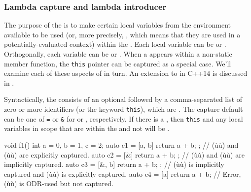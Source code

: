 \subsubsection[Lambda capture and lambda introducer]{Lambda capture and lambda introducer}\label{lambda-capture-and-lambda-introducer}

The purpose of the  is to make certain local
variables from the environment available to be used (or, more precisely,
, which means that they are used in a
potentially-evaluated context) within the . Each
local variable can be  or . Orthogonally, each variable can be  or . When a  appears within a non-static member function, the
\lstinline!this! pointer can be captured as a special case. We'll examine
each of these aspects of  in turn. An extension
to  in C++14 is discussed in .

Syntactically, the  consists of an optional
 followed by a comma-separated list of zero or
more identifiers (or the keyword \lstinline!this!), which are
. The capture default can be one of
\lstinline!=! or \lstinline!&! for  or
, respectively. If there is a
, then \lstinline!this! and any local variables in
scope that are  within the  and not
 will be .

\begin{emcppslisting}
void f1()
{
    int a = 0, b = 1, c = 2;
    auto c1 = [a, b]{ return a + b; };
        // (ù{}ù) and (ù{}ù) are explicitly captured.
    auto c2 = [&]{ return a + b; };
        // (ù{}ù) and (ù{}ù) are implicitly captured.
    auto c3 = [&, b]{ return a + b; };
        // (ù{}ù) is implicitly captured and (ù{}ù) is explicitly captured.
    auto c4 = [a]{ return a + b; }
        // Error, (ù{}ù) is ODR-used but not captured.
}
\end{emcppslisting}


